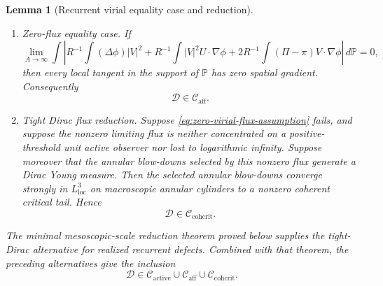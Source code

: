 \documentclass[11pt]{amsart}
\numberwithin{equation}{section}
\theoremstyle{plain}
\newtheorem{lemma}[theorem]{Lemma}
\theoremstyle{definition}
\theoremstyle{remark}
\newcommand{\loc}{\mathrm{loc}}
\newcommand{\Cactive}{\mathcal C_{\mathrm{active}}}
\newcommand{\Caff}{\mathcal C_{\mathrm{aff}}}
\newcommand{\Ccohcrit}{\mathcal C_{\mathrm{cohcrit}}}
\begin{document}
\begin{lemma}[Recurrent virial equality case and reduction]
\begin{enumerate}[label=\textup{(\roman*)}]
   \item \emph{Zero-flux equality case.}  If
   \begin{equation}
   \label{eq:zero-virial-flux-assumption}
      \lim_{A\to\infty}
      \int
      \left|
         R^{-1}\int (\Delta\phi)|V|^2
         +R^{-1}\int |V|^2U\cdot\nabla\phi
         +2R^{-1}\int(\Pi-\pi)V\cdot\nabla\phi
      \right|\,d\mathbb P=0,
   \end{equation}
   then every local tangent in the support of \(\mathbb P\) has zero spatial
   gradient.  Consequently
   \[
      \mathcal D\in\Caff .
   \]
   \item \emph{Tight Dirac flux reduction.}  Suppose
   \eqref{eq:zero-virial-flux-assumption} fails, and suppose the nonzero
   limiting flux is neither concentrated on a positive-threshold unit active
   observer nor lost to logarithmic infinity.  Suppose moreover that the
   annular blow-downs selected by this nonzero flux generate a Dirac Young
   measure.  Then the selected annular blow-downs converge strongly in
   \(L^3_{\loc}\) on macroscopic annular cylinders to a nonzero coherent
   critical tail.  Hence
   \[
      \mathcal D\in\Ccohcrit .
   \]
\end{enumerate}
The minimal mesoscopic-scale reduction theorem proved below supplies the tight-Dirac
alternative for realized recurrent defects.  Combined with that theorem, the
preceding alternatives give the inclusion
\[
   \mathcal D\in\Cactive\cup\Caff\cup\Ccohcrit .
\]
\end{lemma}
\end{document}
